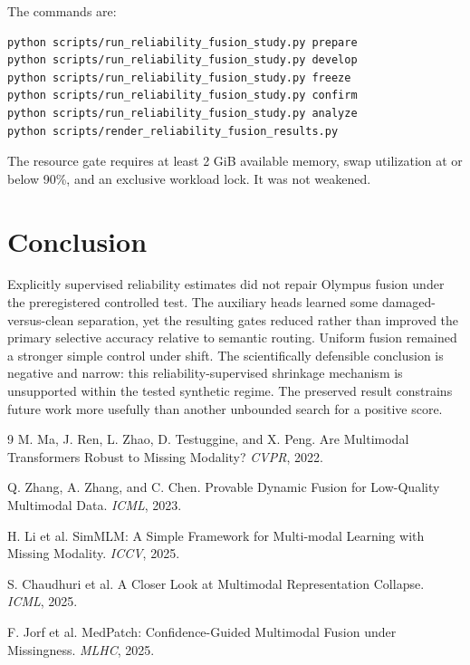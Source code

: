 \documentclass[10pt]{article}
\begin{document}
The commands are:
\begin{verbatim}
python scripts/run_reliability_fusion_study.py prepare
python scripts/run_reliability_fusion_study.py develop
python scripts/run_reliability_fusion_study.py freeze
python scripts/run_reliability_fusion_study.py confirm
python scripts/run_reliability_fusion_study.py analyze
python scripts/render_reliability_fusion_results.py
\end{verbatim}
The resource gate requires at least 2 GiB available memory, swap utilization at or below
90\%, and an exclusive workload lock. It was not weakened.

\section{Conclusion}
Explicitly supervised reliability estimates did not repair Olympus fusion under the
preregistered controlled test. The auxiliary heads learned some damaged-versus-clean
separation, yet the resulting gates reduced rather than improved the primary selective
accuracy relative to semantic routing. Uniform fusion remained a stronger simple control
under shift. The scientifically defensible conclusion is negative and narrow: this
reliability-supervised shrinkage mechanism is unsupported within the tested synthetic
regime. The preserved result constrains future work more usefully than another unbounded
search for a positive score.

\begin{thebibliography}{9}
M. Ma, J. Ren, L. Zhao, D. Testuggine, and X. Peng.
Are Multimodal Transformers Robust to Missing Modality?
\emph{CVPR}, 2022.

Q. Zhang, A. Zhang, and C. Chen.
Provable Dynamic Fusion for Low-Quality Multimodal Data.
\emph{ICML}, 2023.

H. Li et al.
SimMLM: A Simple Framework for Multi-modal Learning with Missing Modality.
\emph{ICCV}, 2025.

S. Chaudhuri et al.
A Closer Look at Multimodal Representation Collapse.
\emph{ICML}, 2025.

F. Jorf et al.
MedPatch: Confidence-Guided Multimodal Fusion under Missingness.
\emph{MLHC}, 2025.
\end{thebibliography}
\end{document}
